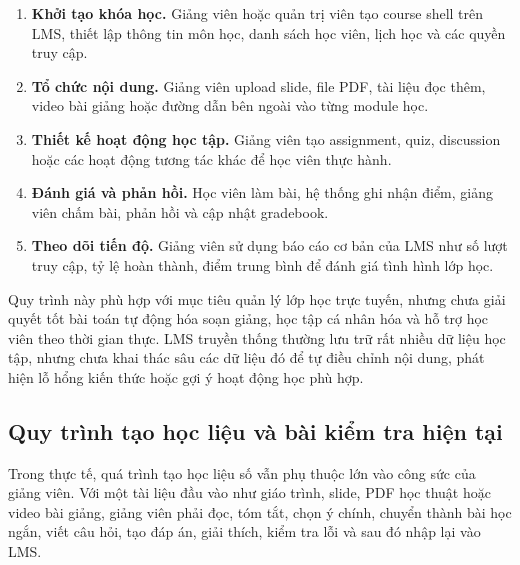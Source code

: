 \begin{enumerate}
    \item \textbf{Khởi tạo khóa học.} Giảng viên hoặc quản trị viên tạo course
          shell trên LMS, thiết lập thông tin môn học, danh sách học viên, lịch
          học và các quyền truy cập.
    \item \textbf{Tổ chức nội dung.} Giảng viên upload slide, file PDF, tài
          liệu đọc thêm, video bài giảng hoặc đường dẫn bên ngoài vào từng
          module học.
    \item \textbf{Thiết kế hoạt động học tập.} Giảng viên tạo assignment,
          quiz, discussion hoặc các hoạt động tương tác khác để học viên thực
          hành.
    \item \textbf{Đánh giá và phản hồi.} Học viên làm bài, hệ thống ghi nhận
          điểm, giảng viên chấm bài, phản hồi và cập nhật gradebook.
    \item \textbf{Theo dõi tiến độ.} Giảng viên sử dụng báo cáo cơ bản của LMS
          như số lượt truy cập, tỷ lệ hoàn thành, điểm trung bình để đánh giá
          tình hình lớp học.
\end{enumerate}

Quy trình này phù hợp với mục tiêu quản lý lớp học trực tuyến, nhưng chưa giải
quyết tốt bài toán tự động hóa soạn giảng, học tập cá nhân hóa và hỗ trợ học
viên theo thời gian thực. LMS truyền thống thường lưu trữ rất nhiều dữ liệu học
tập, nhưng chưa khai thác sâu các dữ liệu đó để tự điều chỉnh nội dung, phát
hiện lỗ hổng kiến thức hoặc gợi ý hoạt động học phù hợp.

\subsection{Quy trình tạo học liệu và bài kiểm tra hiện tại}

Trong thực tế, quá trình tạo học liệu số vẫn phụ thuộc lớn vào công sức của
giảng viên. Với một tài liệu đầu vào như giáo trình, slide, PDF học thuật hoặc
video bài giảng, giảng viên phải đọc, tóm tắt, chọn ý chính, chuyển thành bài
học ngắn, viết câu hỏi, tạo đáp án, giải thích, kiểm tra lỗi và sau đó nhập lại
vào LMS.

